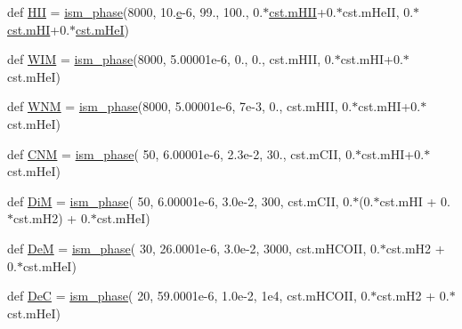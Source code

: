 \begin{DoxyCompactItemize}
\item 
def \hyperlink{namespacephases__collection_a7bb67ada21406d94c4e307f60dea0d69}{H\+II} = \hyperlink{namespacephases__collection_aae55a1d8374bfc3868cd04555c049676}{ism\+\_\+phase}(8000, 10.\hyperlink{constants_8h_a2b076531cd50c7b55702a53221f2ac72}{e}-\/6, 99., 100., 0.$\ast$\hyperlink{constants_8h_a469899272f9f1b48961397bbd6cc84eb}{cst.\+m\+H\+II}+0.$\ast$cst.\+m\+He\+II, 0.$\ast$\hyperlink{constants_8h_a269606ec235d66ed4e8fc93442842cef}{cst.\+m\+HI}+0.$\ast$\hyperlink{constants_8h_a4158a5aec7d8c74f97fdbf32566a7fb6}{cst.\+m\+HeI})
\item 
def \hyperlink{namespacephases__collection_a7a67a11c06d5a83afdb42e75e67ec069}{W\+IM} = \hyperlink{namespacephases__collection_aae55a1d8374bfc3868cd04555c049676}{ism\+\_\+phase}(8000, 5.\+00001e-\/6, 0., 0., cst.\+m\+H\+I\+I, 0.$\ast$cst.\+m\+H\+I+0.$\ast$cst.\+m\+He\+I)
\item 
def \hyperlink{namespacephases__collection_a91f22be2df532cf33b685f7ee6da249d}{W\+NM} = \hyperlink{namespacephases__collection_aae55a1d8374bfc3868cd04555c049676}{ism\+\_\+phase}(8000, 5.\+00001e-\/6, 7e-\/3, 0., cst.\+m\+H\+I\+I, 0.$\ast$cst.\+m\+H\+I+0.$\ast$cst.\+m\+He\+I)
\item 
def \hyperlink{namespacephases__collection_aaeb80e44c07a5ff65c4c13bf597fd682}{C\+NM} = \hyperlink{namespacephases__collection_aae55a1d8374bfc3868cd04555c049676}{ism\+\_\+phase}( 50, 6.\+00001e-\/6, 2.\+3e-\/2, 30., cst.\+m\+C\+I\+I, 0.$\ast$cst.\+m\+H\+I+0.$\ast$cst.\+m\+He\+I)
\item 
def \hyperlink{namespacephases__collection_aea510fe67ff57ffd322b7af98ae593f2}{DiM} = \hyperlink{namespacephases__collection_aae55a1d8374bfc3868cd04555c049676}{ism\+\_\+phase}( 50, 6.\+00001e-\/6, 3.\+0e-\/2, 300, cst.\+m\+C\+I\+I, 0.$\ast$(0.$\ast$cst.\+m\+H\+I + 0.$\ast$cst.\+m\+H2) + 0.$\ast$cst.\+m\+He\+I)
\item 
def \hyperlink{namespacephases__collection_ade2507f5191c147595031d0c1dffaf8d}{DeM} = \hyperlink{namespacephases__collection_aae55a1d8374bfc3868cd04555c049676}{ism\+\_\+phase}( 30, 26.\+0001e-\/6, 3.\+0e-\/2, 3000, cst.\+m\+H\+C\+O\+I\+I, 0.$\ast$cst.\+m\+H2 + 0.$\ast$cst.\+m\+He\+I)
\item 
def \hyperlink{namespacephases__collection_acf79414bea5ec0f4b82be487964ba138}{DeC} = \hyperlink{namespacephases__collection_aae55a1d8374bfc3868cd04555c049676}{ism\+\_\+phase}( 20, 59.\+0001e-\/6, 1.\+0e-\/2, 1e4, cst.\+m\+H\+C\+O\+I\+I, 0.$\ast$cst.\+m\+H2 + 0.$\ast$cst.\+m\+He\+I)
\end{DoxyCompactItemize}


